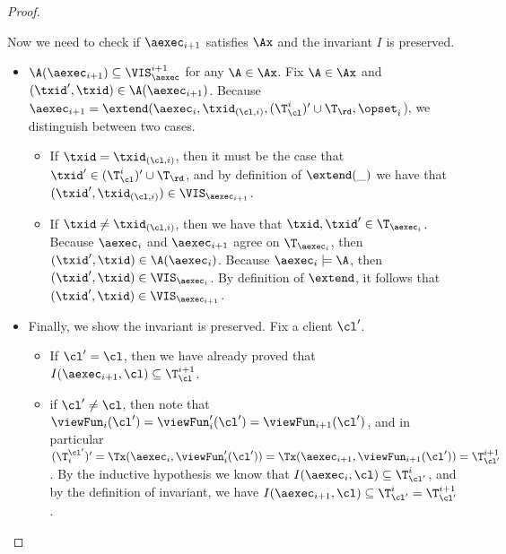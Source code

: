 \begin{proof}
\begin{itemize}
Now we need to check if \( \aexec_{i+1} \) satisfies \( \Ax\) and the invariant \( I \) is preserved.
\begin{itemize}
\item $\A(\aexec_{i+1}) \subseteq \VIS_{\aexec}^{i+1}$ for any $\A \in \Ax$.
Fix $\A \in \Ax$ and $(\txid', \txid) \in \A(\aexec_{i+1})$. 
Because $\aexec_{i+1} = \extend(\aexec_{i}, \txid_{(\cl, i)}, (\T_{\cl}^{i})' \cup \T_\rd, \opset_{i}$), 
we distinguish between two cases.
\begin{itemize}
\item If $\txid = \txid_{(\cl, i)}$, then it must be the case that $\txid' \in (\T^{i}_{\cl})' \cup \T_\rd$, 
and by definition of $\extend(\_)$ we have that $(\txid' ,\txid_{(\cl, i)}) \in \VIS_{\aexec_{i+1}}$. 
\item If $\txid \neq \txid_{(\cl, i)}$, then we have that $\txid, \txid' \in \T_{\aexec_{i}}$. 
Because $\aexec_{i}$ and $\aexec_{i+1}$ agree on $\T_{\aexec_{i}}$, then $(\txid', \txid) \in \A(\aexec_{i})$.
Because $\aexec_{i} \models \A$, then $(\txid', \txid) \in \VIS_{\aexec_{i}}$. 
By definition of $\extend$, it follows that $(\txid', \txid) \in \VIS_{\aexec_{i+1}}$.
\end{itemize}

\item Finally, we show the invariant is preserved.
Fix a client $\cl'$. 
\begin{itemize}
\item If $\cl' = \cl$, then we have already proved that 
$I(\aexec_{i+1}, \cl) \subseteq \T_{\cl}^{i+1}$. 
\item if $\cl' \neq \cl$, then note that $\viewFun_{i}(\cl') = \viewFun'_{i}(\cl') = \viewFun_{i+1}(\cl')$, 
and in particular $(\T^{\cl'}_{i})' = \Tx(\aexec_{i}, \viewFun'_{i}(\cl')) = \Tx(\aexec_{i+1}, \viewFun_{i+1}(\cl')) =  \T_{\cl'}^{i+1}$.
By the inductive hypothesis we know that $I(\aexec_{i}, \cl) \subseteq \T_{\cl'}^{i}$, 
and by the definition of invariant, we have $I(\aexec_{i+1}, \cl) \subseteq \T_{\cl'}^{i} = \T_{\cl'}^{i+1}$. 
\end{itemize}
\end{itemize}
\end{itemize}
\end{proof}


